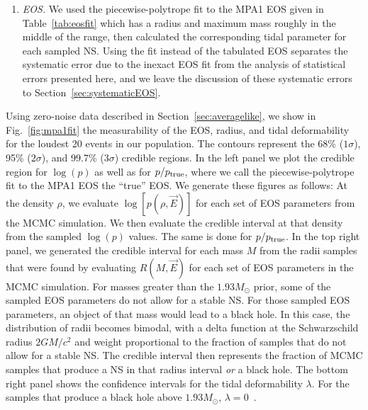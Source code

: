 \documentclass[twocolumn,prd,amssymb,aps,nofootinbib,showpacs,epsf]{revtex4}
\newcommand{\red}{\textcolor{red}}
\begin{document}
\begin{enumerate}
\item \textit{EOS.} We used the piecewise-polytrope fit to the MPA1 EOS given in Table~\ref{tab:eosfit} which has a radius and maximum mass roughly in the middle of the range, then calculated the corresponding tidal parameter for each sampled NS. Using the fit instead of the tabulated EOS separates the systematic error due to the inexact EOS fit from the analysis of statistical errors presented here, and we leave the discussion of these systematic errors to Section~\ref{sec:systematicEOS}.

\end{enumerate}

Using zero-noise data described in Section~\ref{sec:averagelike}, we show in Fig.~\ref{fig:mpa1fit} the measurability of the EOS, radius, and tidal deformability for the loudest 20 events in our population. The contours represent the 68\% ($1\sigma$), 95\% ($2\sigma$), and 99.7\% ($3\sigma$) credible regions. In the left panel we plot the credible region for $\log(p)$ as well as for $p/p_{\rm true}$, where we call the piecewise-polytrope fit to the MPA1 EOS the ``true'' EOS. We generate these figures as follows: At the density $\rho$, we evaluate $\log[p(\rho, \vec E)]$ for each set of EOS parameters from the MCMC simulation. We then evaluate the credible interval at that density from the sampled $\log(p)$ values. The same is done for $p/p_{\rm true}$. In the top right panel, we generated the credible interval for each mass $M$ from the radii samples that were found by evaluating $R(M, \vec E)$ for each set of EOS parameters in the MCMC simulation. For masses greater than the $1.93M_\odot$ prior, some of the sampled EOS parameters do not allow for a stable NS. For those sampled EOS parameters, an object of that mass would lead to a black hole. In this case, the distribution of radii becomes bimodal, with a delta function at the Schwarzschild radius $2GM/c^2$ and weight proportional to the fraction of samples that do not allow for a stable NS. The credible interval then represents the fraction of MCMC samples that produce a NS in that radius interval \textit{or} a black hole. The bottom right panel shows the confidence intervals for the tidal deformability $\lambda$. For the samples that produce a black hole above $1.93M_\odot$, $\lambda=0$~\cite{BinningtonPoisson2009}.

\end{document}
